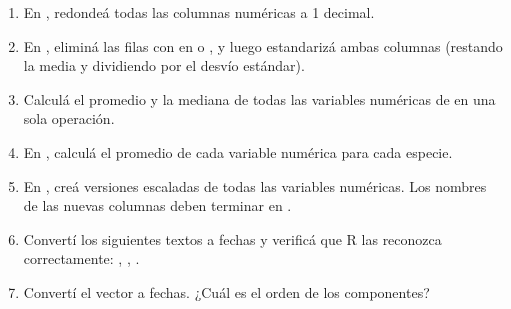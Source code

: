 \documentclass[8pt]{beamer}
\begin{document}
	\begin{frame}[fragile]
		\begin{enumerate}[start=8]
			\item En , redondeá todas las columnas numéricas a 1 decimal.

			\item En , eliminá las filas con  en  o , y luego estandarizá ambas columnas (restando la media y dividiendo por el desvío estándar).

			\item Calculá el promedio y la mediana de todas las variables numéricas de  en una sola operación.

			\item En , calculá el promedio de cada variable numérica para cada especie.

			\item En , creá versiones escaladas de todas las variables numéricas. Los nombres de las nuevas columnas deben terminar en .

			\item Convertí los siguientes textos a fechas y verificá que R las reconozca correctamente: , , .

			\item Convertí el vector  a fechas. ¿Cuál es el orden de los componentes?
		\end{enumerate}
	\end{frame}
\end{document}
